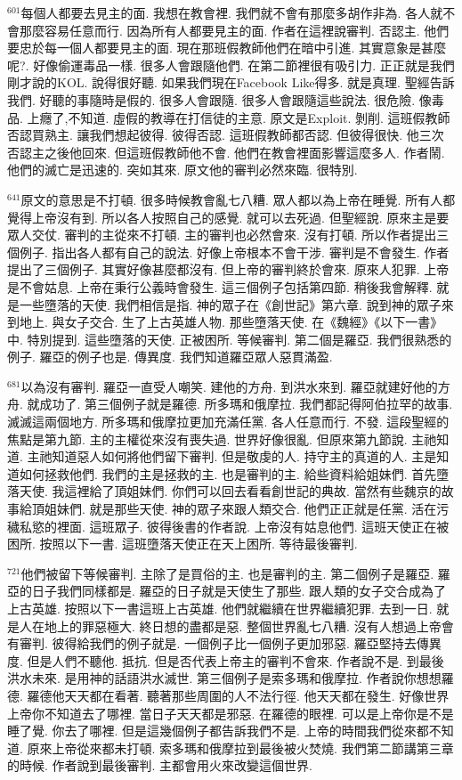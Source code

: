 \documentclass{book}
\begin{document}
$^{601}$每個人都要去見主的面.
我想在教會裡.
我們就不會有那麼多胡作非為.
各人就不會那麼容易任意而行.
因為所有人都要見主的面.
作者在這裡說審判.
否認主.
他們要忠於每一個人都要見主的面.
現在那班假教師他們在暗中引進.
其實意象是甚麼呢?.
好像偷運毒品一樣.
很多人會跟隨他們.
在第二節裡很有吸引力.
正正就是我們剛才說的KOL.
說得很好聽.
如果我們現在Facebook Like得多.
就是真理.
聖經告訴我們.
好聽的事隨時是假的.
很多人會跟隨.
很多人會跟隨這些說法.
很危險.
像毒品.
上癮了,不知道.
虛假的教導在打信徒的主意.
原文是Exploit.
剝削.
這班假教師否認買熟主.
讓我們想起彼得.
彼得否認.
這班假教師都否認.
但彼得很快.
他三次否認主之後他回來.
但這班假教師他不會.
他們在教會裡面影響這麼多人.
作者鬧.
他們的滅亡是迅速的.
突如其來.
原文他的審判必然來臨.
很特別.

$^{641}$原文的意思是不打頓.
很多時候教會亂七八糟.
眾人都以為上帝在睡覺.
所有人都覺得上帝沒有到.
所以各人按照自己的感覺.
就可以去死過.
但聖經說.
原來主是要眾人交仗.
審判的主從來不打頓.
主的審判也必然會來.
沒有打頓.
所以作者提出三個例子.
指出各人都有自己的說法.
好像上帝根本不會干涉.
審判是不會發生.
作者提出了三個例子.
其實好像甚麼都沒有.
但上帝的審判終於會來.
原來人犯罪.
上帝是不會姑息.
上帝在秉行公義時會發生.
這三個例子包括第四節.
稍後我會解釋.
就是一些墮落的天使.
我們相信是指.
神的眾子在《創世記》第六章.
說到神的眾子來到地上.
與女子交合.
生了上古英雄人物.
那些墮落天使.
在《魏經》《以下一書》中.
特別提到.
這些墮落的天使.
正被困所.
等候審判.
第二個是羅亞.
我們很熟悉的例子.
羅亞的例子也是.
傳異度.
我們知道羅亞眾人惡貫滿盈.

$^{681}$以為沒有審判.
羅亞一直受人嘲笑.
建他的方舟.
到洪水來到.
羅亞就建好他的方舟.
就成功了.
第三個例子就是羅德.
所多瑪和俄摩拉.
我們都記得阿伯拉罕的故事.
滅滅這兩個地方.
所多瑪和俄摩拉更加充滿任黨.
各人任意而行.
不發.
這段聖經的焦點是第九節.
主的主權從來沒有喪失過.
世界好像很亂.
但原來第九節說.
主祂知道.
主祂知道惡人如何將他們留下審判.
但是敬虔的人.
持守主的真道的人.
主是知道如何拯救他們.
我們的主是拯救的主.
也是審判的主.
給些資料給姐妹們.
首先墮落天使.
我這裡給了頂姐妹們.
你們可以回去看看創世記的典故.
當然有些魏京的故事給頂姐妹們.
就是那些天使.
神的眾子來跟人類交合.
他們正正就是任黨.
活在污穢私慾的裡面.
這班眾子.
彼得後書的作者說.
上帝沒有姑息他們.
這班天使正在被困所.
按照以下一書.
這班墮落天使正在天上困所.
等待最後審判.

$^{721}$他們被留下等候審判.
主除了是買俗的主.
也是審判的主.
第二個例子是羅亞.
羅亞的日子我們同樣都是.
羅亞的日子就是天使生了那些.
跟人類的女子交合成為了上古英雄.
按照以下一書這班上古英雄.
他們就繼續在世界繼續犯罪.
去到一日.
就是人在地上的罪惡極大.
終日想的盡都是惡.
整個世界亂七八糟.
沒有人想過上帝會有審判.
彼得給我們的例子就是.
一個例子比一個例子更加邪惡.
羅亞堅持去傳異度.
但是人們不聽他.
抵抗.
但是否代表上帝主的審判不會來.
作者說不是.
到最後洪水未來.
是用神的話語洪水滅世.
第三個例子是索多瑪和俄摩拉.
作者說你想想羅德.
羅德他天天都在看著.
聽著那些周圍的人不法行徑.
他天天都在發生.
好像世界上帝你不知道去了哪裡.
當日子天天都是邪惡.
在羅德的眼裡.
可以是上帝你是不是睡了覺.
你去了哪裡.
但是這幾個例子都告訴我們不是.
上帝的時間我們從來都不知道.
原來上帝從來都未打頓.
索多瑪和俄摩拉到最後被火焚燒.
我們第二節講第三章的時候.
作者說到最後審判.
主都會用火來改變這個世界.
\end{document}
